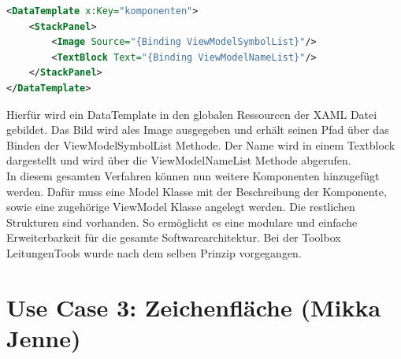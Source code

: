 \begin{lstlisting}[language=XML,
    frame=single,           % Ein Rahmen um den Code
    framexleftmargin=15pt,  % Rahmen link von den Zahlen
    style=algoBericht,
    label={komponentenToolsView},
    captionpos=b,           % Caption unter den Code setzen
caption={KomponentenToolsView XAML-Code}]
<DataTemplate x:Key="komponenten">
    <StackPanel>
        <Image Source="{Binding ViewModelSymbolList}"/>
		<TextBlock Text="{Binding ViewModelNameList}"/>
	</StackPanel>
</DataTemplate>
\end{lstlisting}
Hierfür wird ein DataTemplate in den globalen Ressourcen der XAML Datei gebildet. Das Bild wird ales Image ausgegeben und erhält seinen Pfad über das Binden der ViewModelSymbolList Methode. Der Name wird in einem Textblock dargestellt und wird über die ViewModelNameList Methode abgerufen.
\\
\linebreak
In diesem gesamten Verfahren können nun weitere Komponenten hinzugefügt werden. Dafür muss eine Model Klasse mit der Beschreibung der Komponente, sowie eine zugehörige ViewModel Klasse angelegt werden. Die restlichen Strukturen sind vorhanden. So ermöglicht es eine modulare und einfache Erweiterbarkeit für die gesamte Softwarearchitektur. Bei der Toolbox LeitungenTools wurde nach dem selben Prinzip vorgegangen. 
\pagebreak
\section{Use Case 3: Zeichenfläche (Mikka Jenne)}
